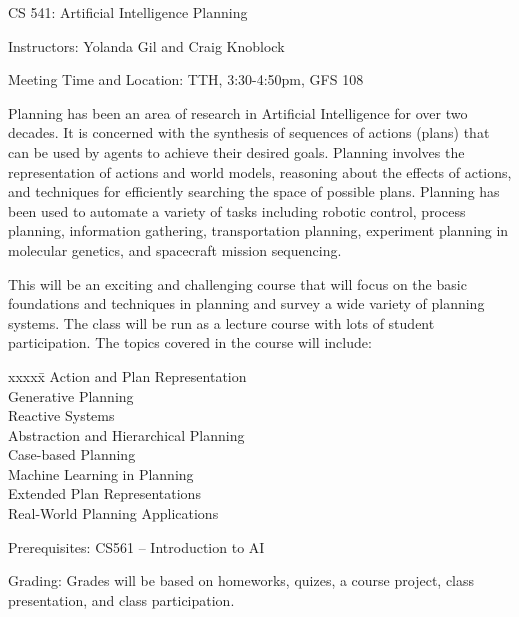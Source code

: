 


{\flushleft
{\centerline
{\Large CS 541: Artificial Intelligence Planning}
}}

\vspace{.2in}

{\flushleft
{\large Instructors: Yolanda Gil and Craig Knoblock}
}

{\flushleft
{\large Meeting Time and Location: TTH, 3:30-4:50pm, GFS 108}
}

\vspace{.2in}

Planning has been an area of research in Artificial Intelligence for
over two decades.  It is concerned with the synthesis of sequences of
actions (plans) that can be used by agents to achieve their desired
goals.  Planning involves the representation of actions and world
models, reasoning about the effects of actions, and techniques for
efficiently searching the space of possible plans.  Planning has been
used to automate a variety of tasks including robotic control,
process planning, information gathering, transportation planning,
experiment planning in molecular genetics, and spacecraft mission sequencing.

This will be an exciting and challenging course that will focus on the
basic foundations and techniques in planning and survey a wide variety
of planning systems.  The class will be run as a lecture course with
lots of student participation.  The topics covered in the course will
include:

\begin{tabbing}
xxxxx\= \kill
\>Action and Plan Representation\\
\>Generative Planning\\
\>Reactive Systems\\
\>Abstraction and Hierarchical Planning\\
\>Case-based Planning\\
\>Machine Learning in Planning\\
\>Extended Plan Representations\\
\>Real-World Planning Applications
\end{tabbing}

{\flushleft Prerequisites: CS561 -- Introduction to AI }

{\flushleft Grading: Grades will be based on homeworks, quizes, a course project, 
class presentation, and class participation.}

